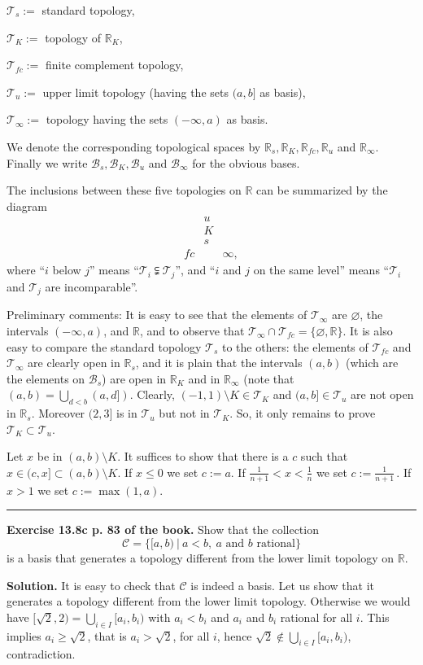 \documentclass[12pt,letterpaper]{article}
\newcommand{\B}{\mathcal B}
\newcommand{\hs}{\bigskip\hrule\medskip}
\newcommand{\mc}{\mathcal}
\newcommand{\noi}{\noindent}%
\newcommand{\sm}{\setminus}
\newcommand{\R}{\mathbb R}
\newcommand{\T}{\mathcal T}
\begin{document}
$\T_s:=$ standard topology, 

$\T_K:=$ topology of $\R_K$, 

$\T_{fc}:=$ finite complement topology, 

$\T_u:=$ upper limit topology (having the sets $(a,b]$ as basis), 

$\T_\infty:=$ topology having the sets $(-\infty,a)$ as basis. 

\noi We denote the corresponding topological spaces by $\R_s,\R_K,\R_{fc},\R_u$ and $\R_\infty$. Finally we write $\B_s,\B_K,\B_u$ and $\B_\infty$ for the obvious bases. 

The inclusions between these five topologies on $\R$ can be summarized by the diagram 
$$
\begin{matrix}
&u\\ 
&K\\ 
&s\\ 
fc&&\infty,
\end{matrix}
$$ 
where ``$i$ below $j$'' means ``$\T_i\subsetneqq\T_j$'', and ``$i$ and $j$ on the same level'' means ``$\T_i$ and $\T_j$ are incomparable''. 

Preliminary comments: It is easy to see that the elements of $\T_\infty$ are $\varnothing$, the intervals $(-\infty,a)$, and $\R$, and to observe that $\T_\infty\cap\T_{fc}=\{\varnothing,\R\}$. It is also easy to compare the standard topology $\T_s$ to the others: the elements of $\T_{fc}$ and $\T_\infty$ are clearly open in $\R_s$, and it is plain that the intervals $(a,b)$ (which are the elements on $\B_s$) are open in $\R_K$ and in $\R_\infty$ (note that $(a,b)=\bigcup_{d<b}(a,d])$. Clearly, $(-1,1)\sm K\in\T_K$ and $(a,b]\in\T_u$ are not open in $\R_s$. Moreover $(2,3]$ is in $\T_u$ but not in $\T_K$. So, it only remains to prove $\T_K\subset\T_u$. 

Let $x$ be in $(a,b)\sm K$. It suffices to show that there is a $c$ such that $x\in(c,x]\subset(a,b)\sm K$. If $x\le0$ we set $c:=a$. If $\frac1{n+1}<x<\frac1n$ we set $c:=\frac1{n+1}\,$. If $x>1$ we set $c:=\max(1,a)$. 

\hs

\noi\textbf{Exercise 13.8c p. 83 of the book.} Show that the collection 
$$
\mc C=\{[a,b)\ |\ a<b,\ a \text{ and $b$ rational}\}
$$ 
is a basis that generates a topology different from the lower limit topology on $\R$. 

\noi\textbf{Solution.} It is easy to check that $\mc C$ is indeed a basis. Let us show that it generates a topology different from the lower limit topology. Otherwise we would have $[\sqrt2,2)=\bigcup_{i\in I}[a_i,b_i)$ with $a_i<b_i$ and $a_i$ and $b_i$ rational for all $i$. This implies $a_i\ge\sqrt2$, that is $a_i>\sqrt2$, for all $i$, hence $\sqrt2\notin\bigcup_{i\in I}[a_i,b_i)$, contradiction. 
\end{document}
